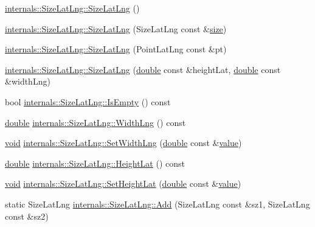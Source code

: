 \begin{DoxyCompactItemize}
\item 
\hyperlink{group___o_p_map_widget_ga577f5727b9da5a209c90b8a1616d168c}{internals\-::\-Size\-Lat\-Lng\-::\-Size\-Lat\-Lng} ()
\item 
\hyperlink{group___o_p_map_widget_ga3981b48b207701daa66030fc596bfda2}{internals\-::\-Size\-Lat\-Lng\-::\-Size\-Lat\-Lng} (Size\-Lat\-Lng const \&\hyperlink{glext_8h_a014d89bd76f74ef3a29c8f04b473eb76}{size})
\item 
\hyperlink{group___o_p_map_widget_gaac692b4a2979e688baced1205991cf2a}{internals\-::\-Size\-Lat\-Lng\-::\-Size\-Lat\-Lng} (Point\-Lat\-Lng const \&pt)
\item 
\hyperlink{group___o_p_map_widget_ga1d7d8f77f50a09f416f4fd64170db374}{internals\-::\-Size\-Lat\-Lng\-::\-Size\-Lat\-Lng} (\hyperlink{_super_l_u_support_8h_a8956b2b9f49bf918deed98379d159ca7}{double} const \&height\-Lat, \hyperlink{_super_l_u_support_8h_a8956b2b9f49bf918deed98379d159ca7}{double} const \&width\-Lng)
\item 
bool \hyperlink{group___o_p_map_widget_ga33e0b9f4dd15b12e9a3053753a9d2335}{internals\-::\-Size\-Lat\-Lng\-::\-Is\-Empty} () const 
\item 
\hyperlink{_super_l_u_support_8h_a8956b2b9f49bf918deed98379d159ca7}{double} \hyperlink{group___o_p_map_widget_ga4c692638cdb086a911d2bfc4a8d93f70}{internals\-::\-Size\-Lat\-Lng\-::\-Width\-Lng} () const 
\item 
\hyperlink{group___u_a_v_objects_plugin_ga444cf2ff3f0ecbe028adce838d373f5c}{void} \hyperlink{group___o_p_map_widget_ga73df3d96826b8dbf86b2676c759d867e}{internals\-::\-Size\-Lat\-Lng\-::\-Set\-Width\-Lng} (\hyperlink{_super_l_u_support_8h_a8956b2b9f49bf918deed98379d159ca7}{double} const \&\hyperlink{glext_8h_aa0e2e9cea7f208d28acda0480144beb0}{value})
\item 
\hyperlink{_super_l_u_support_8h_a8956b2b9f49bf918deed98379d159ca7}{double} \hyperlink{group___o_p_map_widget_ga54840364c05e0258bc30df133bd36107}{internals\-::\-Size\-Lat\-Lng\-::\-Height\-Lat} () const 
\item 
\hyperlink{group___u_a_v_objects_plugin_ga444cf2ff3f0ecbe028adce838d373f5c}{void} \hyperlink{group___o_p_map_widget_gaf25f9fe7c877df23a2cce0194354c001}{internals\-::\-Size\-Lat\-Lng\-::\-Set\-Height\-Lat} (\hyperlink{_super_l_u_support_8h_a8956b2b9f49bf918deed98379d159ca7}{double} const \&\hyperlink{glext_8h_aa0e2e9cea7f208d28acda0480144beb0}{value})
\item 
static Size\-Lat\-Lng \hyperlink{group___o_p_map_widget_gab3c5d8301e62629897221a2d5b2ba0b7}{internals\-::\-Size\-Lat\-Lng\-::\-Add} (Size\-Lat\-Lng const \&sz1, Size\-Lat\-Lng const \&sz2)

\end{DoxyCompactItemize}
